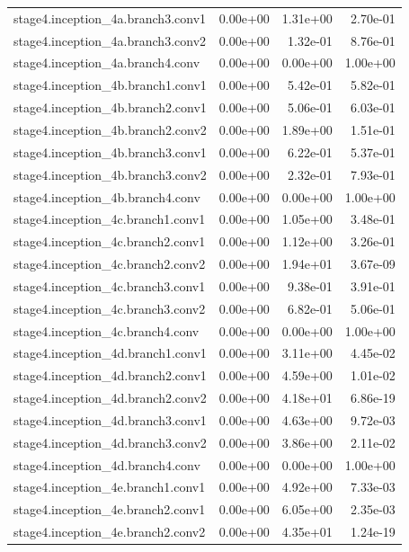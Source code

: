 \begin{longtable}{lrrr}
stage4.inception_4a.branch3.conv1 & 0.00e+00 & 1.31e+00 & 2.70e-01 \\
stage4.inception_4a.branch3.conv2 & 0.00e+00 & 1.32e-01 & 8.76e-01 \\
stage4.inception_4a.branch4.conv & 0.00e+00 & 0.00e+00 & 1.00e+00 \\
stage4.inception_4b.branch1.conv1 & 0.00e+00 & 5.42e-01 & 5.82e-01 \\
stage4.inception_4b.branch2.conv1 & 0.00e+00 & 5.06e-01 & 6.03e-01 \\
stage4.inception_4b.branch2.conv2 & 0.00e+00 & 1.89e+00 & 1.51e-01 \\
stage4.inception_4b.branch3.conv1 & 0.00e+00 & 6.22e-01 & 5.37e-01 \\
stage4.inception_4b.branch3.conv2 & 0.00e+00 & 2.32e-01 & 7.93e-01 \\
stage4.inception_4b.branch4.conv & 0.00e+00 & 0.00e+00 & 1.00e+00 \\
stage4.inception_4c.branch1.conv1 & 0.00e+00 & 1.05e+00 & 3.48e-01 \\
stage4.inception_4c.branch2.conv1 & 0.00e+00 & 1.12e+00 & 3.26e-01 \\
stage4.inception_4c.branch2.conv2 & 0.00e+00 & 1.94e+01 & 3.67e-09 \\
stage4.inception_4c.branch3.conv1 & 0.00e+00 & 9.38e-01 & 3.91e-01 \\
stage4.inception_4c.branch3.conv2 & 0.00e+00 & 6.82e-01 & 5.06e-01 \\
stage4.inception_4c.branch4.conv & 0.00e+00 & 0.00e+00 & 1.00e+00 \\
stage4.inception_4d.branch1.conv1 & 0.00e+00 & 3.11e+00 & 4.45e-02 \\
stage4.inception_4d.branch2.conv1 & 0.00e+00 & 4.59e+00 & 1.01e-02 \\
stage4.inception_4d.branch2.conv2 & 0.00e+00 & 4.18e+01 & 6.86e-19 \\
stage4.inception_4d.branch3.conv1 & 0.00e+00 & 4.63e+00 & 9.72e-03 \\
stage4.inception_4d.branch3.conv2 & 0.00e+00 & 3.86e+00 & 2.11e-02 \\
stage4.inception_4d.branch4.conv & 0.00e+00 & 0.00e+00 & 1.00e+00 \\
stage4.inception_4e.branch1.conv1 & 0.00e+00 & 4.92e+00 & 7.33e-03 \\
stage4.inception_4e.branch2.conv1 & 0.00e+00 & 6.05e+00 & 2.35e-03 \\
stage4.inception_4e.branch2.conv2 & 0.00e+00 & 4.35e+01 & 1.24e-19 \\

\end{longtable}
